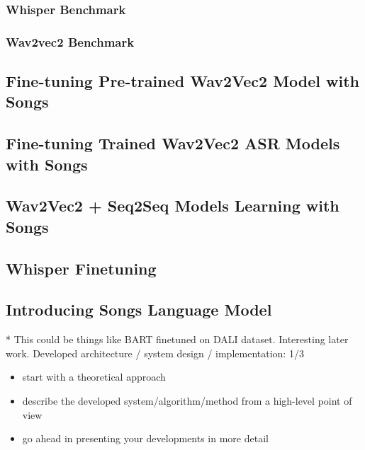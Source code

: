 \subsubsection{Whisper Benchmark}%
\label{sec:whisperbenchmark}

\subsubsection{Wav2vec2 Benchmark}%
\label{sec:whisperbenchmark}

\subsection{Fine-tuning Pre-trained Wav2Vec2 Model with Songs}%
\label{sec:finetunepretrainedwav2vec2}

\subsection{Fine-tuning Trained Wav2Vec2 ASR Models with Songs}%
\label{sec:finetunewav2vec2}

\subsection{Wav2Vec2 + Seq2Seq Models Learning with Songs}%
\label{sec:seqtoseqlearning}

\subsection{Whisper Finetuning}%
\label{sec:whisperfinetuning}

\subsection{Introducing Songs Language Model}%
\label{sec:songlanguagemodel}
* This could be things like BART finetuned on DALI dataset. Interesting later work.
Developed architecture / system design / implementation: 1/3

\begin{itemize}
    \item start with a theoretical approach
    \item describe the developed system/algorithm/method from a high-level point of view
    \item go ahead in presenting your developments in more detail
\end{itemize}
